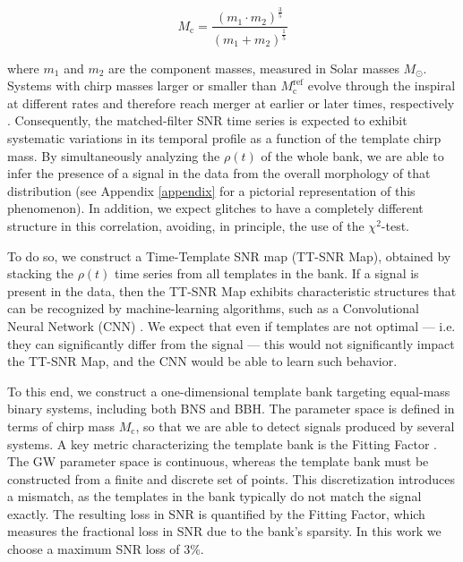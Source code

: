 \documentclass[aps,prd,twocolumn,superscriptaddress,nofootinbib, longbibliography]{revtex4-2}
\begin{document}
\begin{equation}
	M_\mathrm{c} = \frac{(m_1 \cdot m_2)^{\frac{3}{5}}}{(m_1 + m_2)^{\frac{1}{5}}}
	\label{eq:chirp-mass}
\end{equation}
	
	 	where $m_1$ and $m_2$ are the component masses, measured in Solar masses $M_\odot$. Systems with chirp masses larger or smaller than $M_\mathrm{c}^\mathrm{ref}$ evolve through the inspiral at different rates and therefore reach merger at earlier or later times, respectively \cite{gwtc4intro}. Consequently, the matched-filter SNR time series is expected to exhibit systematic variations in its temporal profile as a function of the template chirp mass. By simultaneously analyzing the $\rho(t)$ of the whole bank, we are able to infer the presence of a signal in the data from the overall morphology of that distribution (see Appendix \ref{appendix} for a pictorial representation of this phenomenon). In addition, we expect glitches to have a completely different structure in this correlation, avoiding, in principle, the use of the $\chi^2$-test.
	 
	To do so, we construct a Time-Template SNR map (TT-SNR Map), obtained by stacking the $\rho(t)$ time series from all templates in the bank. If a signal is present in the data, then the TT-SNR Map exhibits characteristic structures that can be recognized by machine-learning algorithms, such as a Convolutional Neural Network (CNN) \cite{oshea2015_cnn_intro}. We expect that even if templates are not optimal --- i.e. they can significantly differ from the signal --- this would not significantly impact the TT-SNR Map, and the CNN would be able to learn such behavior.  	
	
	To this end, we construct a one-dimensional template bank targeting equal-mass binary systems, including both BNS and BBH. The parameter space is defined in terms of chirp mass $M_\mathrm{c}$, so that we are able to detect signals produced by several systems. A key metric characterizing the template bank is the Fitting Factor \cite{owen1996_templates}. The GW parameter space is continuous, whereas the template bank must be constructed from a finite and discrete set of points. This discretization introduces a mismatch, as the templates in the bank typically do not match the signal exactly. The resulting loss in SNR is quantified by the Fitting Factor, which measures the fractional loss in SNR due to the bank's sparsity. In this work we choose a maximum SNR loss of $3\%$.
	
\end{document}
